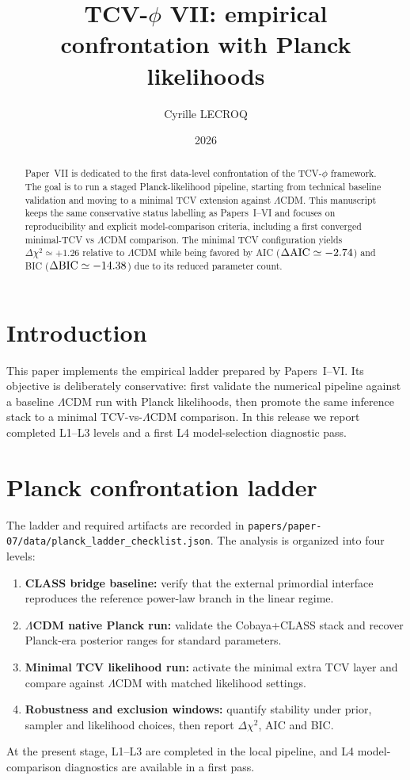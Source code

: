 \documentclass[aps,prd,onecolumn,nofootinbib,superscriptaddress]{revtex4-2}
\begin{document}
\title{TCV-$\phi$ VII: empirical confrontation with Planck likelihoods}

\author{Cyrille LECROQ}

\date{2026}

\begin{abstract}
Paper~VII is dedicated to the first data-level confrontation of the TCV-$\phi$ framework.
The goal is to run a staged Planck-likelihood pipeline, starting from technical baseline validation and moving to a minimal TCV extension against $\Lambda$CDM.
This manuscript keeps the same conservative status labelling as Papers~I--VI and focuses on reproducibility and explicit model-comparison criteria, including a first converged minimal-TCV vs $\Lambda$CDM comparison.
The minimal TCV configuration yields $\Delta\chi^2\simeq +1.26$ relative to $\Lambda$CDM while being favored by AIC ($\Delta{\rm AIC}\simeq -2.74$) and BIC ($\Delta{\rm BIC}\simeq -14.38$) due to its reduced parameter count.
\end{abstract}

\maketitle

\section{Introduction}
This paper implements the empirical ladder prepared by Papers~I--VI.
Its objective is deliberately conservative: first validate the numerical pipeline
against a baseline $\Lambda$CDM run with Planck likelihoods, then promote the
same inference stack to a minimal TCV-vs-$\Lambda$CDM comparison.
In this release we report completed L1--L3 levels and a first L4 model-selection
diagnostic pass.

\section{Planck confrontation ladder}
The ladder and required artifacts are recorded in
\texttt{papers/paper-07/data/planck\_ladder\_checklist.json}.
The analysis is organized into four levels:
\begin{enumerate}[label=(L\arabic*)]
  \item \textbf{CLASS bridge baseline:} verify that the external primordial interface
  reproduces the reference power-law branch in the linear regime.
  \item \textbf{$\Lambda$CDM native Planck run:} validate the Cobaya+CLASS stack and
  recover Planck-era posterior ranges for standard parameters.
  \item \textbf{Minimal TCV likelihood run:} activate the minimal extra TCV layer and
  compare against $\Lambda$CDM with matched likelihood settings.
  \item \textbf{Robustness and exclusion windows:} quantify stability under prior,
  sampler and likelihood choices, then report $\Delta\chi^2$, AIC and BIC.
\end{enumerate}
At the present stage, L1--L3 are completed in the local pipeline, and L4
model-comparison diagnostics are available in a first pass.
\end{document}
